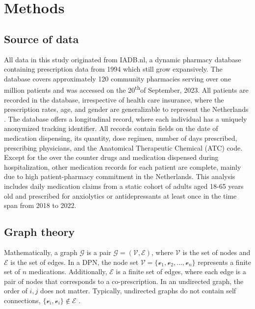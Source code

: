 \documentclass[
  authoryear,
  review]{elsarticle}
\begin{document}
\section{Methods}\label{methods}

\subsection{Source of data}\label{source-of-data}

All data in this study originated from IADB.nl, a dynamic pharmacy
database containing prescription data from 1994 which still grow
expansively. The database covers approximately 120 community pharmacies
serving over one million patients and was accessed on the
20\textsuperscript{th}of September, 2023. All patients are recorded in
the database, irrespective of health care insurance, where the
prescription rates, age, and gender are generalizable to represent the
Netherlands \citep{Visser2013}. The database offers a longitudinal
record, where each individual has a uniquely anonymized tracking
identifier. All records contain fields on the date of medication
dispensing, its quantity, dose regimen, number of days prescribed,
prescribing physicians, and the Anatomical Therapeutic Chemical (ATC)
code. Except for the over the counter drugs and medication dispensed
during hospitalization, other medication records for each patient are
complete, mainly due to high patient-pharmacy commitment in the
Netherlands. This analysis includes daily medication claims from a
static cohort of adults aged 18-65 years old and prescribed for
anxiolytics or antidepressants at least once in the time span from 2018
to 2022.

\subsection{Graph theory}\label{graph-theory}

Mathematically, a graph \(\mathcal{G}\) is a pair
\(\mathcal{G} = (\mathcal{V}, \mathcal{E})\), where \(\mathcal{V}\) is
the set of nodes and \(\mathcal{E}\) is the set of edges. In a DPN, the
node set
\(\mathcal{V} = \{\mathcal{v}_1, \mathcal{v}_2, \dots, \mathcal{v}_n\}\)
represents a finite set of \(n\) medications. Additionally,
\(\mathcal{E}\) is a finite set of edges, where each edge is a pair of
nodes that corresponds to a co-prescription. In an undirected graph, the
order of \(i, j\) does not matter. Typically, undirected graphs do not
contain self connections,
\(\{\mathcal{v}_i, \mathcal{v}_i\} \notin \mathcal{E}\)
\citep{estrada2012structure}.
\end{document}
